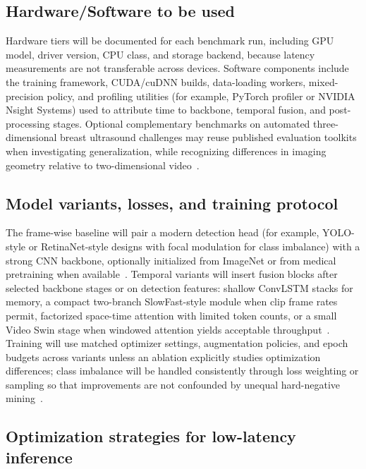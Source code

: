 \documentclass[
english,                 %
bibtex,                  %
]{kththesis}
\numberwithin{listing}{chapter}
\begin{document}
\subsection{Hardware/Software to be used}

Hardware tiers will be documented for each benchmark run, including GPU model, driver version, CPU class, and storage backend, because latency measurements are not transferable across devices.
Software components include the training framework, CUDA/cuDNN builds, data-loading workers, mixed-precision policy, and profiling utilities (for example, PyTorch profiler or NVIDIA Nsight Systems) used to attribute time to backbone, temporal fusion, and post-processing stages.
Optional complementary benchmarks on automated three-dimensional breast ultrasound challenges may reuse published evaluation toolkits when investigating generalization, while recognizing differences in imaging geometry relative to two-dimensional video~\cite{luo2025_tdsc_abus_challenge}.

\subsection{Model variants, losses, and training protocol}

The frame-wise baseline will pair a modern detection head (for example, YOLO-style or RetinaNet-style designs with focal modulation for class imbalance) with a strong CNN backbone, optionally initialized from ImageNet or from medical pretraining when available~\cite{redmon2018_yolov3,lin2017_focal_loss_retinanet,lin2022_buv_miccai}.
Temporal variants will insert fusion blocks after selected backbone stages or on detection features: shallow ConvLSTM stacks for memory, a compact two-branch SlowFast-style module when clip frame rates permit, factorized space-time attention with limited token counts, or a small Video Swin stage when windowed attention yields acceptable throughput~\cite{shi2015_convlstm,feichtenhofer2019_slowfast,bertasius2021_spacetime_attention,liu2022_video_swin_transformer}.
Training will use matched optimizer settings, augmentation policies, and epoch budgets across variants unless an ablation explicitly studies optimization differences; class imbalance will be handled consistently through loss weighting or sampling so that improvements are not confounded by unequal hard-negative mining~\cite{lin2017_focal_loss_retinanet,wang2021_ultrasound_dl_review}.

\subsection{Optimization strategies for low-latency inference}
\end{document}
